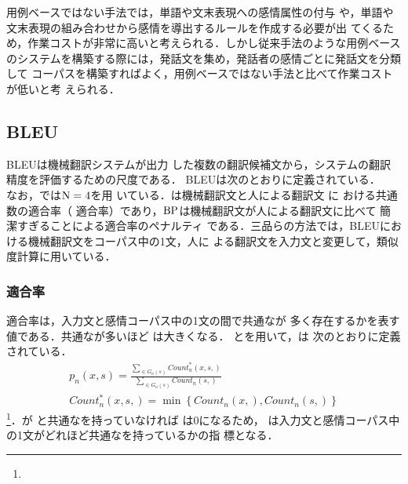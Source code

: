 \documentclass[japanese]{jnlp_1.4}
\def\resp#1{}
\def\respeqn#1{}
\def\bleu{}
\def\ngram{}
\def\NGRAM{}
\begin{document}
用例ベースではない手法では，単語や文末表現への感情属性の付与
や，単語や文末表現の組み合わせから感情を導出するルールを作成する必要が出
てくるため，作業コストが非常に高いと考えられる．しかし従来手法のような用例ベース
のシステムを構築する際には，発話文を集め，発話者の感情ごとに発話文を分類して
コーパスを構築すればよく，用例ベースではない手法と比べて作業コストが低いと考
えられる．


\subsection{BLEU}

BLEUは機械翻訳システムが出力
した複数の翻訳候補文から，システムの翻訳精度を評価するための尺度である．
BLEUは次のとおりに定義されている\cite{bleu}．
\begin{equation}
	\respeqn{{\rm BLEU}(x,y) = {\rm BP} \cdot \exp\left( \sum^{\rm
					      N}_{n=1}\frac{1}{\rm N}\log 
					      p_{n}(x,y) \right) }
		\label{eq:bleu}
\end{equation}
なお，\cite{bleu}では${\rm N} = 4$を用
いている．\resp{{$p_{n}(x,y)$}}は機械翻訳文\resp{{$x$}}と人による翻訳文
\resp{{$y$}}に
おける共通\NGRAM  数の適合率（\NGRAM 
適合率）\resp{を返す関数}であり，$\rm BP$は機械翻訳文が人による翻訳文に比べて
簡潔すぎることによる適合率のペナルティ
である．三品らの方法では，BLEUにおける機械翻訳文をコーパス中の1文，人に
よる翻訳文を入力文と変更して，類似度計算に用いている\resp{（以下，式({\ref{eq:bleu}})を{$sim_{\bleu}$}と表記する）}．


\subsubsection{\NGRAM  適合率}

\NGRAM  適合率\resp{{$p_{n}(x,s)$}}は，入力文\respeqn{$x$}と感情コーパス中の1文\respeqn{$s$}の間で共通な\NGRAM  が
多く存在するかを表す値である．共通な\NGRAM  が多いほど\resp{{$p_{n}(\cdot)$}}
は大きくなる．
\respeqn{$x$}と\respeqn{$s$}を用いて，\resp{{$p_{n}(x,s)$}}は
次のとおりに定義されている．
\begin{gather}
p_{n}(x,s) = \frac{\displaystyle \sum_{\ngram \in 
	G_{n}(s)}Count^{*}_{n}(x, s, \ngram)}{\displaystyle
	\sum_{\ngram \in G_{n}(s)}Count_{n}(s, \ngram)}  \\
Count^{*}_{n}(x, s, \ngram) = \min\left\{Count_{n}(x, \ngram),
	 Count_{n}(s, \ngram)\right\}
	\label{eq:pn}
\end{gather}
\resp{ここで{$G_{n}(s)$}を{$s$}に含まれる``連続する{$n$}個の形態素から作られる形
態素N-gram''の集合を返す関数とする．{$Count_{n}(x, \ngram)$}は，{$x$}中の{$\ngram$}の出現
数を返す}\footnote{\resp{形態素同士の比較は，形態素の文字列と形態素の品詞を用いて行う．こ
れらが一致していれば，二つの形態素は等しいとする．}}．\respeqn{$s$}が
\respeqn{$x$}と共通な\NGRAM  を持っていなければ\resp{{$Count^{*}_{n}(\cdot)$}}
は\resp{すべての{$w_{n}$}で}0になるため，
\resp{{$p_{n}(\cdot)$}}は入力文と感情コーパス中の1文がどれほど共通な\NGRAM  を持っているかの指
標となる．
\end{document}
